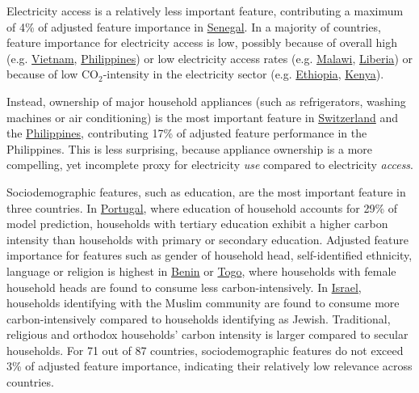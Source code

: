 \documentclass[12pt, a4paper]{article}
\begin{document}
Electricity access is a relatively less important feature, contributing a maximum of 4\% of adjusted feature importance in \hyperref[fig:5b_SEN]{Senegal}. In a majority of countries, feature importance for electricity access is low, possibly because of overall high (e.g. \hyperref[fig:5b_VNM]{Vietnam}, \hyperref[fig:5b_PHL]{Philippines}) or low electricity access rates (e.g. \hyperref[fig:5b_MWI]{Malawi}, \hyperref[fig:5b_LBR]{Liberia}) or because of low CO$_{2}$-intensity in the electricity sector (e.g. \hyperref[fig:5b_ETH]{Ethiopia}, \hyperref[fig:5b_KEN]{Kenya}).

Instead, ownership of major household appliances (such as refrigerators, washing machines or air conditioning) is the most important feature in \hyperref[fig:5b_CHE]{Switzerland} and the \hyperref[fig:5b_PHL]{Philippines}, contributing 17\% of adjusted feature performance in the Philippines. This is less surprising, because appliance ownership is a more compelling, yet incomplete proxy for electricity \textit{use} compared to electricity \textit{access}.

Sociodemographic features, such as education, are the most important feature in three countries. In \hyperref[fig:5b_PRT]{Portugal}, where education of household accounts for 29\% of model prediction, households with tertiary education exhibit a higher carbon intensity than households with primary or secondary education. Adjusted feature importance for features such as gender of household head, self-identified ethnicity, language or religion is highest in \hyperref[fig:5b_BEN]{Benin} or \hyperref[fig:5b_TGO]{Togo}, where households with female household heads are found to consume less carbon-intensively. In \hyperref[fig:5b_ISR]{Israel}, households identifying with the Muslim community are found to consume more carbon-intensively compared to households identifying as Jewish. Traditional, religious and orthodox households' carbon intensity is larger compared to secular households. For 71 out of 87 countries, sociodemographic features do not exceed 3\% of adjusted feature importance, indicating their relatively low relevance across countries.
\end{document}
